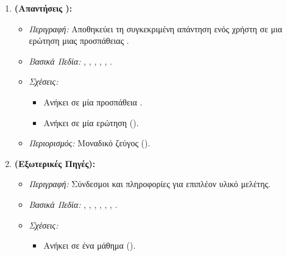 \begin{enumerate}[leftmargin=*, label=\arabic*., wide, labelwidth=!, labelindent=0pt, itemsep=1ex]
    \item \textbf{\texttt{} (Απαντήσεις ):}
        \begin{itemize}[leftmargin=1.5em, noitemsep]
            \item \textit{Περιγραφή:} Αποθηκεύει τη συγκεκριμένη απάντηση ενός χρήστη σε μια ερώτηση μιας προσπάθειας .
            \item \textit{Βασικά Πεδία:} \texttt{}, \texttt{}, \texttt{}, \texttt{}, \texttt{}, \texttt{}.
            \item \textit{Σχέσεις:}
            \begin{itemize}[leftmargin=1.5em, noitemsep]
                \item Ανήκει σε μία προσπάθεια .
                \item Ανήκει σε μία ερώτηση ().
            \end{itemize}
            \item \textit{Περιορισμός:} Μοναδικό ζεύγος (\texttt{}).
        \end{itemize}

    \item \textbf{\texttt{} (Εξωτερικές Πηγές):}
        \begin{itemize}[leftmargin=1.5em, noitemsep]
            \item \textit{Περιγραφή:} Σύνδεσμοι και πληροφορίες για επιπλέον υλικό μελέτης.
            \item \textit{Βασικά Πεδία:} \texttt{}, \texttt{}, \texttt{}, \texttt{}, \texttt{}, \texttt{}, \texttt{}.
            \item \textit{Σχέσεις:}
            \begin{itemize}[leftmargin=1.5em, noitemsep]
                \item Ανήκει σε ένα μάθημα ().
            \end{itemize}
        \end{itemize}


\end{enumerate}
